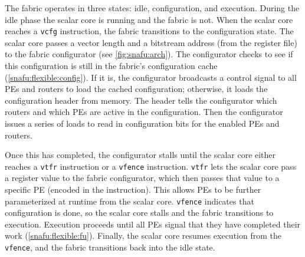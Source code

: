 The \snafuframe fabric operates in three states: idle, configuration, and execution.
% 
During the idle phase the scalar core is running and the fabric is not.
% 
When the scalar core reaches a {\tt vcfg} instruction, the fabric transitions to the configuration state.
% 
The scalar core passes a vector length and a bitstream address (from the register file) to the fabric configurator (see \autoref{fig:snafu:arch}).
% 
The configurator checks to see if this configuration is still in the fabric's configuration cache (\autoref{snafu:flexible:config}).
%
If it is, the configurator broadcasts a control signal to all PEs and routers to load the cached configuration;
otherwise, it loads the configuration header from memory.
% 
The header tells the configurator which routers and which PEs are active in the configuration.
% 
Then the configurator issues a series of loads to read in configuration bits for the enabled PEs and routers.
 
Once this has completed, the configurator stalls until the scalar core either reaches a {\tt vtfr} instruction or a {\tt vfence} instruction.
% 
{\tt vtfr} lets the scalar core pass a register value to the fabric configurator, which then passes that value to a specific PE (encoded in the instruction).
% 
This allows PEs to be further parameterized at runtime from the scalar core. %
% 
{\tt vfence} indicates that configuration is done, so the scalar core stalls and the fabric transitions to execution.
% 
Execution proceeds until all PEs signal that they have completed their work (\autoref{snafu:flexible:fu}).
%
Finally, the scalar core resumes execution from the {\tt vfence}, and the fabric transitions back into the idle state.
